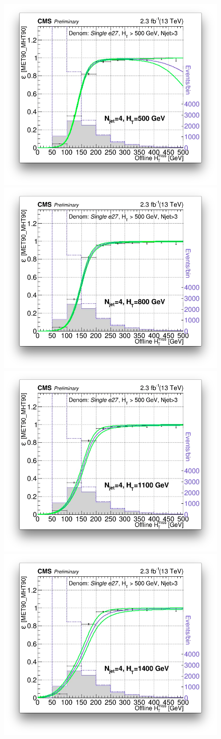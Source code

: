 \begin{figure}[tbp]
  \begin{center}
    \includegraphics[width=0.49\linewidth]{figures/trigger/MonoTrigEff_Ht500.png}
    \includegraphics[width=0.49\linewidth]{figures/trigger/MonoTrigEff_Ht800.png}\\
        \includegraphics[width=0.49\linewidth]{figures/trigger/MonoTrigEff_Ht1100.png}
    \includegraphics[width=0.49\linewidth]{figures/trigger/MonoTrigEff_Ht1400.png}\\

\end{center}
\end{figure}
